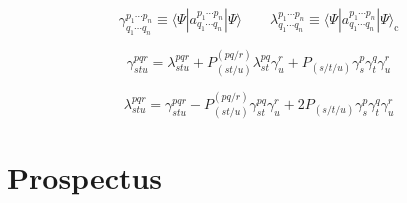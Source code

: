 \begin{equation}
    \gamma^{p_1\cdots p_n}_{q_1\cdots q_n}
    \equiv
    \langle\Psi|a^{p_1\cdots p_n}_{q_1\cdots q_n}|\Psi\rangle
    \qquad
    \lambda^{p_1\cdots p_n}_{q_1\cdots q_n}
    \equiv
    \langle\Psi|a^{p_1\cdots p_n}_{q_1\cdots q_n}|\Psi\rangle_\mathrm{c}
\end{equation}

\begin{equation}
    \gamma^{pqr}_{stu}
    =
    \lambda^{pqr}_{stu}
    +
    P^{(pq/r)}_{(st/u)}
    \lambda^{pq}_{st}
    \gamma^r_u
    +
    P_{(s/t/u)}
    \gamma^p_s
    \gamma^q_t
    \gamma^r_u
\end{equation}

\begin{equation}
    \lambda^{pqr}_{stu}
    =
    \gamma^{pqr}_{stu}
    -
    P^{(pq/r)}_{(st/u)}
    \gamma^{pq}_{st}
    \gamma^r_u
    +
    2
    P_{(s/t/u)}
    \gamma^p_s
    \gamma^q_t
    \gamma^r_u
\end{equation}


\section{Prospectus}


